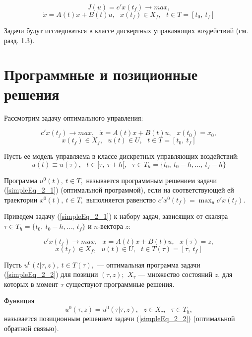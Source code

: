 \begin{equation}
    J(u) = c'x(t_f) \to max,
\end{equation} 
\[ \dot x = A(t)x + B(t)u,~~~x(t_f) \in X_f,~~~t \in T = [t_0,~t_f]\]

Задачи будут исследоваться в классе дискертных управляющих воздействий (см. разд. 1.3).


\section{Программные и позиционные решения}
Рассмотрим задачу оптимального управления:


\begin{equation}\label{simpleEq_2_1}
    c'x(t_f) \to max,~~~\dot x = A(t)x + B(t)u,~~~x(t_0) = x_0,
\end{equation} 
\[ x(t_f) \in X_f,~~~u(t) \in U, ~~~t \in T = [t_0,~t_f]\]


Пусть ее модель управляема в классе дискретных управляющих воздействий:
\[u(t) \equiv u(\tau), ~~~t \in [\tau, ~\tau + h[,~~~ \tau \in T_h = \{t_0,~ t_0 - h, \dots ,~ t_f - h\} \]


\begin{definition}   Программа $u^0(t), ~t \in T,$ называется программным решением задачи (\ref{simpleEq_2_1}) (оптимальной программой), если на соответствующей ей траектории $x^0(t), ~t \in T,$ выполняется равенство $c'x^0(t_f) = \max_u c'x(t_f) $.
\end{definition}


Приведем задачу (\ref{simpleEq_2_1}) к набору задач, зависящих от скаляра $\tau \in T_h = \{t_0,~ t_0 - h, \dots ,~ t_f\}$ и $n$-вектора $z$:


\begin{equation}\label{simpleEq_2_2}
    c'x(t_f) \to max,~~~\dot x = A(t)x + B(t)u,~~~x(\tau) = z,
\end{equation} 
\[ x(t_f) \in X_f, ~~~u(t) \in U ,~~~t \in T(\tau) = [\tau,~t_f]\]


Пусть $ u^0(t|\tau, z),~ t \in T(\tau), $ --- оптимальная программа задачи (\ref{simpleEq_2_2}) для позиции $(\tau, z)$; $~X_\tau$ --- множество состояний $z$, для которых в момент $\tau$ существуют программные решения.


\begin{definition}   Функиция
\[ u^0(\tau, z) = u^0(\tau|\tau, z),~~~ z \in X_\tau,~~~ \tau \in T_h,\]
называется позиционным решением задачи (\ref{simpleEq_2_2}) (оптимальной обратной связью).
\end{definition}
 

